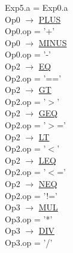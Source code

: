\documentclass[\main/MemoriaPL.tex]{subfiles}
\begin{document}
    \hspace*{5mm}Exp5.a = Exp0.a\\
    Op0 $\rightarrow$ \underline{PLUS}\\
    \hspace*{5mm}Op0.op = '+'\\
    Op0 $\rightarrow$ \underline{MINUS}\\
    \hspace*{5mm}Op0.op = '-'\\
    Op2 $\rightarrow$ \underline{EQ}\\
    \hspace*{5mm}Op2.op = '=='\\
    Op2 $\rightarrow$ \underline{GT}\\
    \hspace*{5mm}Op2.op = '$>$'\\
    Op2 $\rightarrow$ \underline{GEQ}\\
    \hspace*{5mm}Op2.op = '$>$='\\
    Op2 $\rightarrow$ \underline{LT}\\
    \hspace*{5mm}Op2.op = '$<$'\\
    Op2 $\rightarrow$ \underline{LEQ}\\
    \hspace*{5mm}Op2.op = '$<$='\\
    Op2 $\rightarrow$ \underline{NEQ}\\
    \hspace*{5mm}Op2.op = '!='\\
    Op3 $\rightarrow$ \underline{MUL}\\
    \hspace*{5mm}Op3.op = '*'\\
    Op3 $\rightarrow$ \underline{DIV}\\
    \hspace*{5mm}Op3.op = '/'\\
\end{document}
